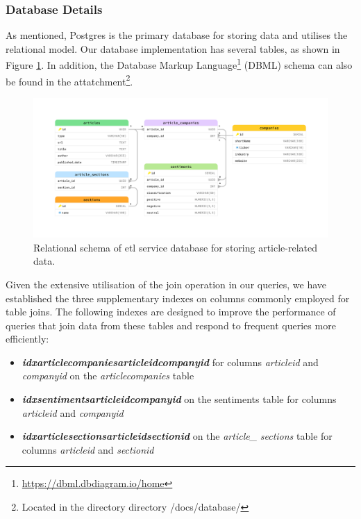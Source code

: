 \subsubsection{Database Details}
\label{subsubsec:architecture-etl-database-details}
As mentioned, Postgres is the primary database for storing data and utilises the relational model. Our database implementation has several tables, as shown in Figure \ref{fig:architecture-etl-database-schema}. In addition, the Database Markup Language\footnote{\href{https://dbml.dbdiagram.io/home}{https://dbml.dbdiagram.io/home}} (DBML) schema can also be found in the attatchment\footnote{Located in the directory directory /docs/database/}.

\begin{figure}[htbp]
    \centering
    \includegraphics[width=\textwidth]{img/architecture/database-schema.pdf}
    \caption{Relational schema of \acrshort{etl} service database for storing article-related data.}
    \label{fig:architecture-etl-database-schema}
\end{figure}

Given the extensive utilisation of the join operation in our queries, we have established the three supplementary indexes on columns commonly employed for table joins. The following indexes are designed to improve the performance of queries that join data from these tables and respond to frequent queries more efficiently:

\begin{itemize}
    \item \textbf{\textit{idx\textunderscore article\textunderscore companies\textunderscore article\textunderscore id\textunderscore company\textunderscore id}} for columns \textit{article\textunderscore id} and \textit{company\textunderscore id} on the \textit{article\textunderscore companies} table
    \item \textbf{\textit{idx\textunderscore sentiments\textunderscore article\textunderscore id\textunderscore company\textunderscore id}} on the sentiments table for columns \textit{article\textunderscore id} and \textit{company\textunderscore id}
    \item \textbf{\textit{idx\textunderscore article\textunderscore sections\textunderscore article\textunderscore id\textunderscore section\textunderscore id}} on the \textit{article\_ }\textit{sections} table for columns \textit{article\textunderscore id} and \textit{section\textunderscore id}
\end{itemize}

